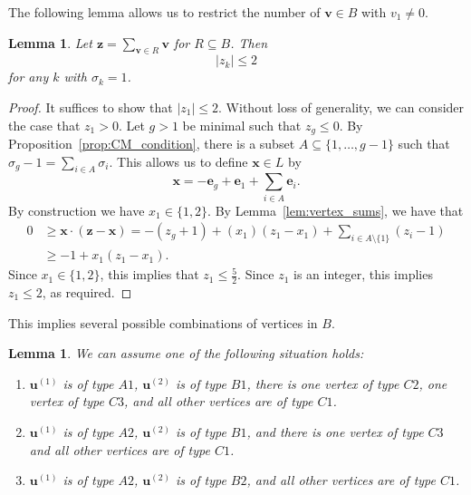\documentclass{amsart} %
\newcommand{\e}{\bm{e}}
\newcommand{\bv}{\bm{v}}
\newcommand{\bu}{\bm{u}}
\theoremstyle{thm}
\newtheorem{lem}[Theorem]{Lemma}
\theoremstyle{definition}
\numberwithin{equation}{section}
\begin{document}
The following lemma allows us to restrict the number of $\bv\in B$ with $v_1\neq 0$.
\begin{lem}\label{lem:total_e1_bound}
Let $\bm{z}=\sum_{\bv\in R} \bv$ for $R\subseteq B$. Then
\[
|z_k| \leq 2
\]
for any $k$ with $\sigma_k=1$.
\end{lem}
\begin{proof}
It suffices to show that $|z_1| \leq 2$. Without loss of generality, we can consider the case that $z_1 >0$. Let $g>1$ be minimal such that $z_g \leq 0$. By Proposition~\ref{prop:CM_condition}, there is a subset $A \subseteq \{1, \dots, g-1\}$ such that $\sigma_g -1 = \sum_{i \in A}\sigma_i$. This allows us to define $\bm{x}\in L$ by
\[
\bm{x}=-\e_g + \e_1 + \sum_{i\in A} \e_i.
\]
By construction we have $x_1 \in \{1,2\}$.
By Lemma~\ref{lem:vertex_sums}, we have that
\begin{align*}
    0&\geq \bm{x}\cdot(\bm{z}-\bm{x}) = -(z_g +1) + (x_1)(z_1 -x_1)+ \sum_{i\in A\setminus\{1\}} (z_i -1)\\
    &\geq -1 + x_1(z_1 -x_1).
\end{align*}
Since $x_1 \in \{1,2\}$, this implies that $z_1\leq \frac52$. Since $z_1$ is an integer, this implies $z_1\leq 2$, as required.
\end{proof}
This implies several possible combinations of vertices in $B$.
\begin{lem}\label{lem:veryslack_trichotomy} We can assume one of the following situation holds:
\begin{enumerate}[label=(\Roman*)]
    \item\label{it:vslackI} $\bu^{(1)}$ is of type $A1$, $\bu^{(2)}$ is of type $B1$, there is one vertex of type $C2$, one vertex of type $C3$, and all other vertices are of type $C1$.
    \item\label{it:vslackII} $\bu^{(1)}$ is of type $A2$, $\bu^{(2)}$ is of type $B1$, and there is one vertex of type $C3$ and all other vertices are of type $C1$.
    \item\label{it:vslackIII} $\bu^{(1)}$ is of type $A2$, $\bu^{(2)}$ is of type $B2$, and all other vertices are of type $C1$.
\end{enumerate}
\end{lem}
\end{document}
